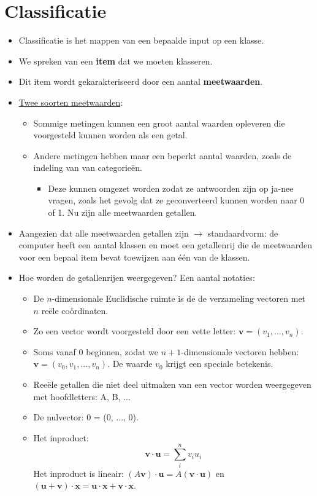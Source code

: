 \section{Classificatie}
\begin{itemize}
	\item Classificatie is het mappen van een bepaalde input op een klasse.
	\item We spreken van een \textbf{item} dat we moeten klasseren.
	\item Dit item wordt gekarakteriseerd door een aantal \textbf{meetwaarden}.
	\item \underline{Twee soorten meetwaarden}:
	\begin{itemize}
		\item Sommige metingen kunnen een groot aantal waarden opleveren die voorgesteld kunnen worden als een getal.
		\item Andere metingen hebben maar een beperkt aantal waarden, zoals de indeling van van categorieën. 
		\begin{itemize}
			\item Deze kunnen omgezet worden zodat ze antwoorden zijn op ja-nee vragen, zoals het gevolg dat ze geconverteerd kunnen worden naar 0 of 1.
			\good Nu zijn alle meetwaarden getallen.	
		\end{itemize}
	\end{itemize}
	\item Aangezien dat alle meetwaarden getallen zijn $\rightarrow$ standaardvorm: de computer heeft een aantal klassen en moet een getallenrij die de meetwaarden voor een bepaal item bevat toewijzen aan één van de klassen.
	\item Hoe worden de getallenrijen weergegeven? Een aantal notaties:
	\begin{itemize}
		\item De $n$-dimensionale Euclidische ruimte is de de verzameling vectoren met $n$ reële coördinaten.
		\item Zo een vector wordt voorgesteld door een vette letter: $\textbf{v} = (v_1, ..., v_n)$.
		\item Soms vanaf 0 beginnen, zodat we $n+1$-dimensionale vectoren hebben: $\textbf{v} = (v_0, v_1, ..., v_n)$. De waarde $v_0$ krijgt een speciale betekenis.
		\item Reeële getallen die niet deel uitmaken van een vector worden weergegeven met hoofdletters: A, B, ...
		\item De nulvector: 0 = (0, ..., 0).
		\item Het inproduct:
		$$\textbf{v}\cdot\textbf{u} = \sum_{i}^{n}v_iu_i$$
		Het inproduct is lineair: $(A\textbf{v})\cdot \textbf{u} = A(\textbf{v}\cdot\textbf{u})$ en $(\textbf{u} + \textbf{v})\cdot\textbf{x} = \textbf{u} \cdot \textbf{x} + \textbf{v} \cdot \textbf{x}$.
		

\end{itemize}
\end{itemize}
